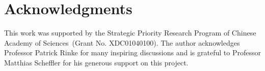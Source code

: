 \documentclass[journal=jpca,manuscript=article]{achemso}
\begin{document}
\section{Acknowledgments}
This work was supported by the Strategic Priority Research Program of Chinese Academy of Sciences~(Grant No. XDC01040100). The author acknowledges Professor Patrick Rinke for many inspiring discussions and is grateful to Professor Matthias Scheffler for his generous support on this project.



  
\end{document}
